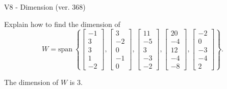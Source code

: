 \begin{exercise}
  \begin{exerciseTitle}V8 - Dimension (ver. 368)\end{exerciseTitle}
  \begin{exerciseStatement}
    Explain how to find the dimension of 
\[W=\mathrm{span}\ \left\{\left[\begin{array}{r}
-1 \\
3 \\
3 \\
1 \\
-2
\end{array}\right] , \left[\begin{array}{r}
3 \\
-2 \\
0 \\
-1 \\
0
\end{array}\right] , \left[\begin{array}{r}
11 \\
-5 \\
3 \\
-3 \\
-2
\end{array}\right] , \left[\begin{array}{r}
20 \\
-4 \\
12 \\
-4 \\
-8
\end{array}\right] , \left[\begin{array}{r}
-2 \\
0 \\
-3 \\
-4 \\
2
\end{array}\right]\right\}.\]



  \end{exerciseStatement}
  \begin{exerciseAnswer}
   The dimension of \(W\) is  \(3\).
  


  \end{exerciseAnswer}
\end{exercise}